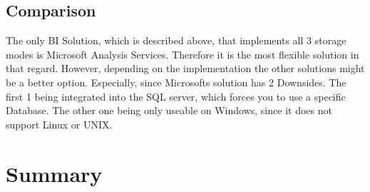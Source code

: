 \documentclass[12pt,a4paper,oneside, 
liststotoc, 					%
bibtotoc,						%
titlepage, 						%
headsepline, 					%
BCOR6mm,						%
openany,							%
]{scrreprt}
\begin{document}
\section{Comparison}\label{comparison}
The only BI Solution, which is described above, that implements all 3 storage modes is Microsoft Analysis Services. Therefore it is the most flexible solution in that regard. However, depending on the implementation the other solutions might be a better option. Especially, since Microsofts solution has 2 Downsides. The first 1 being integrated into the SQL server, which forces you to use a specific Database. The other one being only useable on Windows, since it does not support Linux or UNIX. 
\chapter{Summary}
  
\printbibliography
\begin{appendix}
\clearpage
{}						%
\end{appendix}
\end{document}
